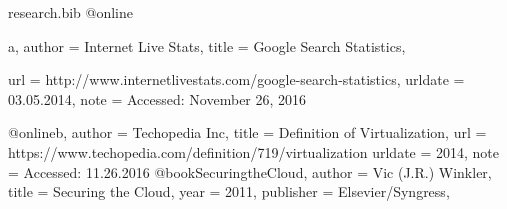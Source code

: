 \documentclass{article}
\begin{document}
	\begin{filecontents*}{research.bib}
		@online{a,
			author = {Internet Live Stats},
			title = {Google Search Statistics},

			url = {http://www.internetlivestats.com/google-search-statistics},
			urldate = {03.05.2014},
			note = {Accessed: November 26, 2016}
		}
		@online{b,
			author = {Techopedia Inc},
			title = {Definition of Virtualization},
			url = {https://www.techopedia.com/definition/719/virtualization}
			urldate = {2014},
			note = {Accessed: 11.26.2016}
		}
		@book{SecuringtheCloud,
			author    = {Vic (J.R.) Winkler},
			title     = {Securing the Cloud},
			year      = {2011},
			publisher = {Elsevier/Syngress},
		}
	
	
		
	\end{filecontents*}

	
\end{document}
